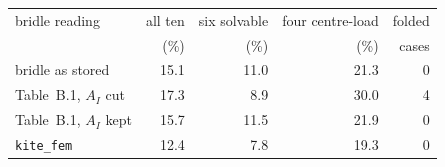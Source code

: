 \begin{tabular}{lrrrr}
\toprule
bridle reading & all ten & six solvable & four centre-load & folded \\
 & (\%) & (\%) & (\%) & cases \\
\midrule
bridle as stored & 15.1 & 11.0 & 21.3 & 0 \\
Table~B.1, $A_I$ cut & 17.3 & 8.9 & 30.0 & 4 \\
Table~B.1, $A_I$ kept & 15.7 & 11.5 & 21.9 & 0 \\
\texttt{kite\_fem} & 12.4 & 7.8 & 19.3 & 0 \\
\bottomrule
\end{tabular}